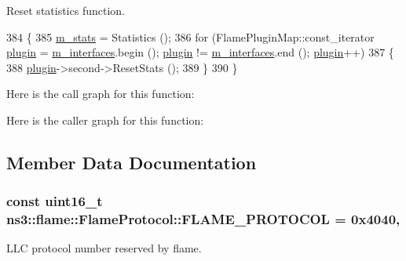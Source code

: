 Reset statistics function. 


\begin{DoxyCode}
384 \{
385   \hyperlink{classns3_1_1flame_1_1FlameProtocol_a9f33727e9f2483dc9d929a7a82956e0c}{m\_stats} = Statistics ();
386   \textcolor{keywordflow}{for} (FlamePluginMap::const\_iterator \hyperlink{visualizer-ideas_8txt_a82212ee380150b652f4dad598413d06f}{plugin} = \hyperlink{classns3_1_1flame_1_1FlameProtocol_ad8595153b7695efc169354d570625d24}{m\_interfaces}.begin (); 
      \hyperlink{visualizer-ideas_8txt_a82212ee380150b652f4dad598413d06f}{plugin} != \hyperlink{classns3_1_1flame_1_1FlameProtocol_ad8595153b7695efc169354d570625d24}{m\_interfaces}.end (); \hyperlink{visualizer-ideas_8txt_a82212ee380150b652f4dad598413d06f}{plugin}++)
387     \{
388       \hyperlink{visualizer-ideas_8txt_a82212ee380150b652f4dad598413d06f}{plugin}->second->ResetStats ();
389     \}
390 \}
\end{DoxyCode}


Here is the call graph for this function\+:




Here is the caller graph for this function\+:




\subsection{Member Data Documentation}
\subsubsection[{\texorpdfstring{F\+L\+A\+M\+E\+\_\+\+P\+R\+O\+T\+O\+C\+OL}{FLAME_PROTOCOL}}]{\setlength{\rightskip}{0pt plus 5cm}const uint16\+\_\+t ns3\+::flame\+::\+Flame\+Protocol\+::\+F\+L\+A\+M\+E\+\_\+\+P\+R\+O\+T\+O\+C\+OL = 0x4040\hspace{0.3cm}{\ttfamily [static]}, {\ttfamily [private]}}\hypertarget{classns3_1_1flame_1_1FlameProtocol_a3d4799f4e6ee746e8e47cae132330c76}{}\label{classns3_1_1flame_1_1FlameProtocol_a3d4799f4e6ee746e8e47cae132330c76}


L\+LC protocol number reserved by flame. 

